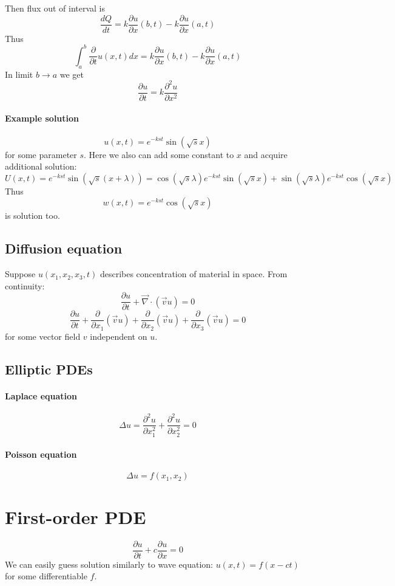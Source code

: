 Then flux out of interval is
$$\frac{dQ}{dt} = k\frac{\partial u}{\partial x}(b,t) - k\frac{\partial u}{\partial x}(a,t)$$
Thus
$$\int_a^b \frac{\partial }{\partial t}u(x,t) dx  = k\frac{\partial u}{\partial x}(b,t) - k\frac{\partial u}{\partial x}(a,t)$$
In limit $b\to a$ we get
$$\frac{\partial u}{\partial t} = k \frac{\partial^2 u}{\partial x^2} $$

\paragraph{Example solution}
$$u(x,t) = e^{-kst} \sin (\sqrt{s} x)$$
for some parameter $s$. Here we also can add some constant to $x$ and acquire additional solution:
$$U(x,t) = e^{-kst} \sin (\sqrt{s} (x+\lambda)) = \cos (\sqrt{s} \lambda ) e^{-kst} \sin (\sqrt{s} x) +  \sin (\sqrt{s} \lambda ) e^{-kst} \cos (\sqrt{s} x)$$
Thus
$$w(x,t) =  e^{-kst} \cos (\sqrt{s} x)$$
is solution too.
\subsection{Diffusion equation}
Suppose
$u(x_1,x_2,x_3,t)$ describes concentration of material in space. From continuity:
$$\frac{\partial u}{\partial t} + \vec{\nabla} \cdot (\vec{v} u) = 0$$
$$\frac{\partial u}{\partial t} +\frac{\partial }{\partial x_1} (\vec{v} u) +\frac{\partial }{\partial x_2} (\vec{v} u) +\frac{\partial }{\partial x_3} (\vec{v} u) = 0$$
for some vector field $v$ independent on $u$.
\subsection{Elliptic PDEs}
\paragraph{Laplace equation}
$$\Delta u = \frac{\partial^2 u}{\partial x_1^2} + \frac{\partial^2 u}{\partial x_2^2} = 0$$
\paragraph{Poisson equation}
$$\Delta u = f(x_1,x_2)$$
\section{First-order PDE}
$$\frac{\partial u}{\partial t} + c\frac{\partial u}{\partial x} = 0$$
We can easily guess solution similarly to wave equation: $u(x,t) = f(x-ct)$ for some differentiable $f$. 

